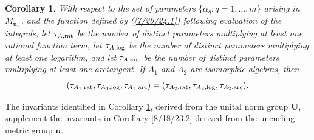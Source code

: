 \documentclass{amsart}
\numberwithin{equation}{section}
\newtheorem{corollary}[theorem]{Corollary}
\theoremstyle{definition}
\numberwithin{theorem}{section}
\begin{document}
\begin{corollary}\label{7/25/24.1} With respect to the set of parameters $\{\alpha_q:q=1,\dots,m\}$ arising in $M_{\mathbf{u}_A}$, and the function defined by (\ref{7/29/24.1}) following evaluation of the integrals, let $\tau_{A,{\rm rat}}$ be the number of distinct parameters multiplying at least one rational function term, let $\tau_{A,{\rm log}}$ be the number of distinct parameters multiplying at least one logarithm, and let $\tau_{A,{\rm arc}}$ be the number of distinct parameters multiplying at least one arctangent.  If $A_1$ and $A_2$ are isomorphic algebras, then \[ (\tau_{A_1,{\rm rat}},\tau_{A_1,{\rm log}},\tau_{A_1,{\rm arc}}) = (\tau_{A_2,{\rm rat}},\tau_{A_2,{\rm log}},\tau_{A_2,{\rm arc}}).\]
\end{corollary}

The invariants identified in Corollary \ref{7/25/24.1}, derived from the unital norm group $\mathbf{U}$, supplement the invariants in Corollary \ref{8/18/23.2} derived from the uncurling metric group $\mathbf{u}$.


\medskip
\end{document}
